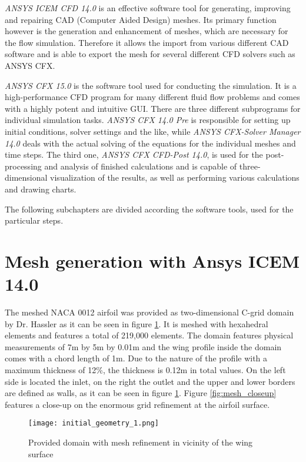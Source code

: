 \emph{ANSYS ICEM CFD 14.0} is an effective software tool for generating, improving and repairing CAD (Computer Aided Design) meshes. Its primary function however is the generation and enhancement of meshes, which are necessary for the flow simulation. Therefore it allows the import from various different CAD software and is able to export the mesh for several different CFD solvers such as ANSYS CFX.
	
\emph{ANSYS CFX 15.0} is the software tool used for conducting the simulation. It is a high-performance CFD program for many different fluid flow problems and comes with a highly potent and intuitive GUI. There are three different subprograms for individual simulation tasks. \emph{ANSYS CFX 14.0 Pre} is responsible for setting up initial conditions, solver settings and the like, while \emph{ANSYS CFX-Solver Manager 14.0} deals with the actual solving of the equations for the individual meshes and time steps. The third one, \emph{ANSYS CFX CFD-Post 14.0}, is used for the post-processing and analysis of finished calculations and is capable of three-dimensional visualization of the results, as well as performing various calculations and drawing charts.

The following subchapters are divided according the software tools, used for the particular steps.
\section{Mesh generation with Ansys ICEM 14.0}
The meshed NACA 0012 airfoil was provided as two-dimensional C-grid domain by Dr. Hassler as it can be seen in figure \ref{fig:init_mesh}. It is meshed with hexahedral elements and features a total of 219,000 elements. The domain features physical measurements of 7m by 5m by 0.01m and the wing profile inside the domain comes with a chord length of 1m. Due to the nature of the profile with a maximum thickness of 12\%, the thickness is 0.12m in total values. On the left side is located the inlet, on the right the outlet and the upper and lower borders are defined as walls, as it can be seen in figure \ref{fig:init_mesh}. Figure \ref{fig:mesh_closeup} features a close-up on the enormous grid refinement at the airfoil surface.
\begin{figure}[ht]
\centering
\texttt{[image: initial\_geometry\_1.png]}
\caption{Provided domain with mesh refinement in vicinity of the wing surface}
\label{fig:init_mesh}
\end{figure}

